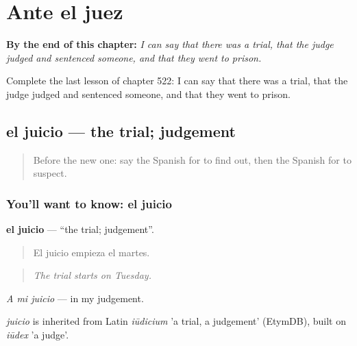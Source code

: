
\chapter{Ante el juez}
\label{ch:es-ante-el-juez}

\begin{chapteropening}
\textbf{By the end of this chapter:} \emph{I can say that there was a trial, that the judge judged and sentenced someone, and that they went to prison.}

Complete the last lesson of chapter 522: I can say that there was a trial, that the judge judged and sentenced someone, and that they went to prison.
\end{chapteropening}

\section[el juicio]{el juicio — the trial; judgement}

\label{lesson:ES-C522-juicio}



\begin{quote}
Before the new one: say the Spanish for to find out, then the Spanish for to suspect.
\end{quote}

\subsection*{You'll want to know: el juicio}
\textbf{el juicio} — \textquotedblleft{}the trial; judgement\textquotedblright{}.

\begin{quote}
El juicio empieza el martes.
\end{quote}

\begin{quote}
\emph{The trial starts on Tuesday.}
\end{quote}

\emph{A mi juicio} — in my judgement.

\begin{cousinweb}
\emph{juicio} is inherited from Latin \emph{iūdicium} 'a trial, a judgement' (EtymDB), built on \emph{iūdex} 'a judge'.
\end{cousinweb}

